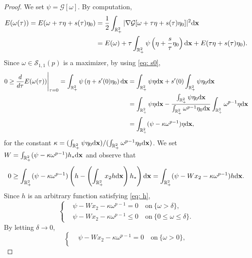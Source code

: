 \documentclass[11pt]{amsart}
\theoremstyle{definition}
\theoremstyle{definition}
\numberwithin{equation}{section}
\newcommand{\0}{\emptyset}
\newcommand{\bfx}{{\bf x}}
\newcommand{\calS}{\mathcal S}
\newcommand{\dd}{\mathrm{d}}
\begin{document}
		\begin{proof}
			We set $\psi=\mathcal{G}[\omega]$. By computation, 
			\begin{align*}
				E(\omega(\tau))=E(\omega+\tau \eta+s(\tau)\eta_0)
				&=\frac{1}{2}\int_{\mathbb{R}^{2}_{+}}|\nabla \mathcal{G}[\omega+\tau \eta+s(\tau)\eta_0]|^{2}\dd\bfx \\
				&=E(\omega)+\tau \int_{\mathbb{R}^{2}_{+}}\psi\left(\eta+\frac{s}{\tau}\eta_0\right)\dd\bfx+E(\tau \eta+s(\tau)\eta_0).
			\end{align*}
			Since $\omega\in \calS_{1,1}(p)$ is a maximizer, by using \eqref{eq: s0}, 
			\begin{align*}
				0\geq \frac{d}{d \tau}E(\omega(\tau))\Bigg|_{\tau=0}
				=\int_{\mathbb{R}^{2}_{+}}\psi\left(\eta+s'(0)\eta_0\right)\dd\bfx
				&=\int_{\mathbb{R}^{2}_{+}}\psi \eta \dd\bfx+s'(0)\int_{\mathbb{R}^{2}_{+}}\psi \eta_0 \dd\bfx \\
				&=\int_{\mathbb{R}^{2}_{+}}\psi \eta \dd\bfx-\frac{\int_{\mathbb{R}^{2}_{+}}\psi \eta_0 \dd\bfx}{\int_{\mathbb{R}^{2}_{+}}\omega^{p-1}\eta_0\dd\bfx}\int_{\mathbb{R}^{2}_{+}}\omega^{p-1}\eta \dd\bfx\\
				&=\int_{\mathbb{R}^{2}_{+}}(\psi-\kappa \omega^{p-1})\eta \dd\bfx,
			\end{align*}
			for the constant $\kappa=(\int_{\mathbb{R}^{2}_{+}}\psi \eta_0 \dd\bfx)/(\int_{\mathbb{R}^{2}_{+}}\omega^{p-1}\eta_0\dd\bfx)$. We set $W=\int_{\mathbb{R}^{2}_{+}}(\psi-\kappa \omega^{p-1}) h_{*}\dd\bfx$ and observe that 
			\begin{align*}
				0\geq \int_{\mathbb{R}^{2}_{+}}(\psi-\kappa \omega^{p-1})\left(h-\left(\int_{\mathbb{R}^{2}_{+}}x_2h\dd\bfx  \right)h_*\right) \dd\bfx
				=\int_{\mathbb{R}^{2}_{+}}(\psi-Wx_2-\kappa \omega^{p-1})h\dd\bfx.
			\end{align*}
			Since $h$ is an arbitrary function satisfying \eqref{eq: h}, 
			\begin{equation*}
				\left\{
				\begin{aligned}
					&\psi-Wx_2-\kappa \omega^{p-1}=0\quad \textrm{on}\ \{\omega>\delta\},\\
					&\psi-Wx_2-\kappa \omega^{p-1}\leq 0\quad \textrm{on}\ \{0\leq \omega\leq \delta\}.
				\end{aligned}
				\right.
			\end{equation*}
			By letting $\delta\to 0$, 
			\begin{equation*}
				\left\{
				\begin{aligned}
					&\psi-Wx_2-\kappa \omega^{p-1}=0\quad \textrm{on}\ \{\omega>0\},\\

\end{aligned}
\end{equation*}
\end{proof}
\end{document}
